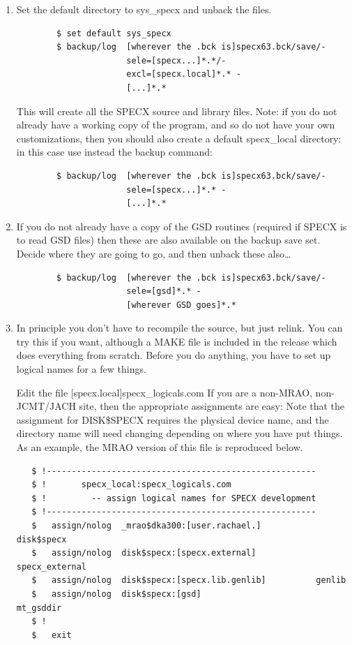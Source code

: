 \documentclass[11pt,twoside]{report}
\begin{document}
\begin{enumerate}
\item Set the default directory to sys\_specx and unback the files.

\begin{verbatim}
        $ set default sys_specx
        $ backup/log  [wherever the .bck is]specx63.bck/save/-
                      sele=[specx...]*.*/-
                      excl=[specx.local]*.* -
                      [...]*.*
\end{verbatim}

This will create all the SPECX source and library files.
Note: if you do not already have a working copy of the program, and
so do not have your own customizations, then
you should also create a default specx\_local directory: in this
case use instead the backup command:

\begin{verbatim}
        $ backup/log  [wherever the .bck is]specx63.bck/save/-
                      sele=[specx...]*.* -
                      [...]*.*
\end{verbatim}

\item If you do not already have a copy of the GSD routines (required
if SPECX is to read GSD files) then these are also available on
the backup save set. Decide where they are going to go, and then
unback these also\ldots

\begin{verbatim}
        $ backup/log  [wherever the .bck is]specx63.bck/save/-
                      sele=[gsd]*.* -
                      [wherever GSD goes]*.*
\end{verbatim}

\item In principle you don't have to recompile the source, but just
relink. You can try this if you want, although a MAKE file is
included in the release which does everything from scratch. Before
you do anything, you have to set up logical names for a few things.

Edit the file [specx.local]specx\_logicals.com If you are a non-MRAO,
non-JCMT/JACH site, then the appropriate assignments are easy: Note that the
assignment for DISK\$SPECX requires the physical device name, and the directory
name will need changing depending on where you have put things. As an example,
the MRAO version of this file is reproduced below. 

\begin{verbatim}
   $ !------------------------------------------------------
   $ !       specx_local:specx_logicals.com
   $ !         -- assign logical names for SPECX development
   $ !------------------------------------------------------
   $   assign/nolog  _mrao$dka300:[user.rachael.]           disk$specx
   $   assign/nolog  disk$specx:[specx.external]            specx_external
   $   assign/nolog  disk$specx:[specx.lib.genlib]          genlib
   $   assign/nolog  disk$specx:[gsd]                       mt_gsddir
   $ !
   $   exit
\end{verbatim}


\end{enumerate}
\end{document}
